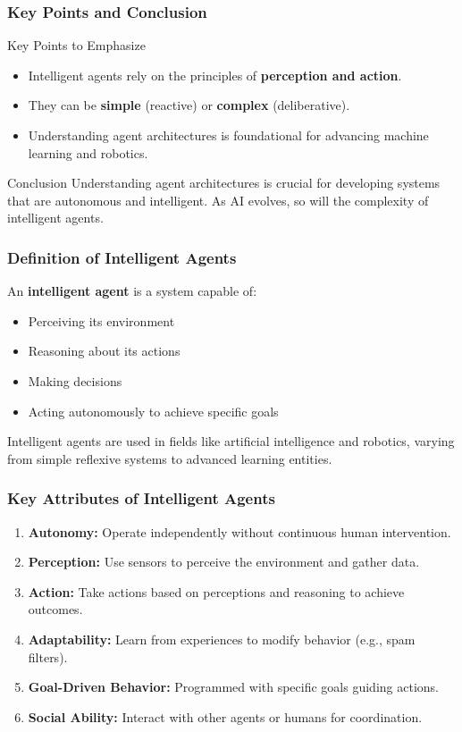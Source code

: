 \documentclass[aspectratio=169]{beamer}
\begin{document}
\begin{frame}[fragile]
    \frametitle{Key Points and Conclusion}
    \begin{block}{Key Points to Emphasize}
        \begin{itemize}
            \item Intelligent agents rely on the principles of \textbf{perception and action}.
            \item They can be \textbf{simple} (reactive) or \textbf{complex} (deliberative).
            \item Understanding agent architectures is foundational for advancing machine learning and robotics.
        \end{itemize}
    \end{block}
    \begin{block}{Conclusion}
        Understanding agent architectures is crucial for developing systems that are autonomous and intelligent. As AI evolves, so will the complexity of intelligent agents.
    \end{block}
\end{frame}

\begin{frame}[fragile]
    \frametitle{Definition of Intelligent Agents}
    An \textbf{intelligent agent} is a system capable of:
    \begin{itemize}
        \item Perceiving its environment
        \item Reasoning about its actions
        \item Making decisions
        \item Acting autonomously to achieve specific goals
    \end{itemize}
    Intelligent agents are used in fields like artificial intelligence and robotics, varying from simple reflexive systems to advanced learning entities.
\end{frame}

\begin{frame}[fragile]
    \frametitle{Key Attributes of Intelligent Agents}
    \begin{enumerate}
        \item \textbf{Autonomy:} Operate independently without continuous human intervention.
        \item \textbf{Perception:} Use sensors to perceive the environment and gather data.
        \item \textbf{Action:} Take actions based on perceptions and reasoning to achieve outcomes.
        \item \textbf{Adaptability:} Learn from experiences to modify behavior (e.g., spam filters).
        \item \textbf{Goal-Driven Behavior:} Programmed with specific goals guiding actions.
        \item \textbf{Social Ability:} Interact with other agents or humans for coordination.
    \end{enumerate}
\end{frame}
\end{document}
